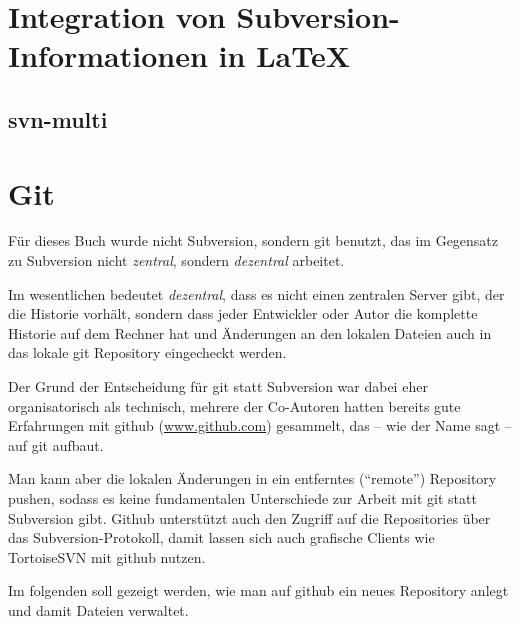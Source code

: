 \section{Integration von Subversion-Informationen in \LaTeX}

\subsection{svn-multi}


\section{Git}

Für dieses Buch wurde nicht Subversion, sondern git benutzt, das im Gegensatz zu Subversion nicht \textit{zentral}, sondern \textit{dezentral} arbeitet. 

Im wesentlichen bedeutet \textit{dezentral}, dass es nicht einen zentralen Server gibt, der die Historie vorhält, sondern dass jeder Entwickler oder Autor die komplette Historie auf dem Rechner hat und Änderungen an den lokalen Dateien auch in das lokale git Repository eingecheckt werden. 

Der Grund der Entscheidung für git statt Subversion war dabei eher organisatorisch als technisch, mehrere der Co-Autoren hatten bereits gute Erfahrungen mit github (\url{www.github.com}) gesammelt, das -- wie der Name sagt -- auf git aufbaut.

Man kann aber die lokalen Änderungen in ein entferntes (\enquote{remote}) Repository pushen, sodass es keine fundamentalen Unterschiede zur Arbeit mit git statt Subversion gibt.
Github unterstützt auch den Zugriff auf die Repositories über das Subversion-Protokoll, damit lassen sich auch grafische Clients wie TortoiseSVN mit github nutzen. 

Im folgenden soll gezeigt werden, wie man auf github ein neues Repository anlegt und damit Dateien verwaltet.


\endinput

Die aus Sicht des Autors beste Lösung ist daher eine Sicherung außerhalb des lokalen Rechners, idealerweise auch auf einem anderen Dateisystem. Der Grund hierfür ist technisch: Es sind Fälle bekannt, in denen Trojaner nicht nur die lokalen Dateien sondern auch alle Dateien auf angeschlossenen Netzlaufwerken verschlüsselten. Eine Sicherung auf einer Netzwerkfreigabe kann daher auch zu wenig sein. 



Und noch ein weiterer Aspekt soll genannt werden: die Arbeit mit mehreren Autoren und/oder auf mehreren Rechnern. Der Autor dieses Kapitels speichert wichtige Dokumente in einem Subversion-Repository. Soll mit einem anderem Rechner an den Dateien gearbeitet werden, so wird dort einfach ein neuer Checkout gemacht. Es darf nur am Ende der Arbeit nicht vergessen werden, die Dateien auch wieder mit dem Repository abzugleichen, dieser wichtige Schritt geht einem aber nach kurzer Zeit \enquote{in Fleisch und Blut} über.

